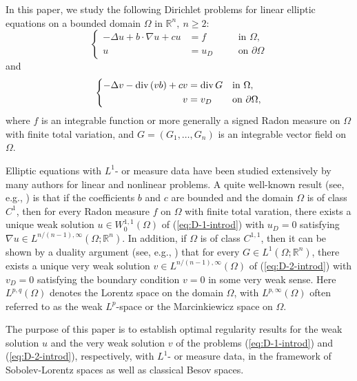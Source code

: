 \documentclass[reqno,centertags,11pt]{amsart}
\theoremstyle{definition}
\numberwithin{thm}{section}
\numberwithin{equation}{section}
\newcommand{\R}{{\mathbb{R}}}
\begin{document}
In this paper, we study   the  following Dirichlet problems  for   linear elliptic equations on a bounded    domain $\Omega$ in   $\R^n ,\ n \ge 2  $:
\begin{equation}\label{eq:D-1-introd}
\left\{\begin{alignedat}{2}
- \Delta u + b \cdot \nabla u +cu  & =f & \quad & \text{in }\Omega,\\
  u & ={u_D} & \quad & \text{on }\partial\Omega
\end{alignedat}\right.
\end{equation}
and
\begin{equation}\label{eq:D-2-introd}
\left\{\begin{alignedat}{2}
- \Delta v -{\rm div}\, (v  b)+ cv  & ={\rm div}\, G & \quad & \text{in }\Omega,\\
  v & =v_D & \quad & \text{on }\partial\Omega ,
\end{alignedat}\right.
\end{equation}
where   $f$ is an integrable function or more generally a signed Radon measure on $\Omega$ with finite total variation, and $G = (G_1 , \ldots , G_n )$ is an integrable vector field on $\Omega$.

Elliptic equations with $L^1$- or measure data have been  studied extensively by many authors  \cite{BBGGPV,BBC,BO,BG,BG2,BS,DMOP,KO,Min07} for linear and nonlinear   problems. A quite well-known result
 (see, e.g., \cite{BBGGPV})
is that  if  the coefficients $b$ and $ c$ are bounded and the domain $\Omega$ is of class $C^{1}$, then  for   every Radon measure $f$ on $\Omega$ with finite total varation, there exists a unique weak solution $u \in W_0^{1,1}(\Omega )$ of (\ref{eq:D-1-introd}) with $u_D=0$ satisfying $\nabla u \in L^{n/(n-1), \infty }(\Omega; \R^n )$.
In addition, if $\Omega$ is of class $C^{1,1}$, then it can be shown by a duality argument (see, e.g.,  \cite{KO}) that
for every $G\in L^1 (\Omega ; \R^n )$, there exists a unique very weak solution $v \in L^{n/(n-1), \infty }(\Omega )$ of (\ref{eq:D-2-introd}) with  $v_D=0$ satisfying the boundary condition $v=0$ in some very weak sense.
Here  $L^{p,q}(\Omega )$ denotes  the  Lorentz space on the domain $\Omega$, with $L^{p,\infty}(\Omega )$ often referred to as the weak $L^p$-space or the Marcinkiewicz space on $\Omega$.


The purpose of  this paper is to establish optimal     regularity results for the weak solution $u$ and the very weak solution $v$ of the problems  (\ref{eq:D-1-introd}) and (\ref{eq:D-2-introd}), respectively,  with $L^1$- or measure data, in the framework of Sobolev-Lorentz spaces as well as classical  Besov spaces.
\end{document}
